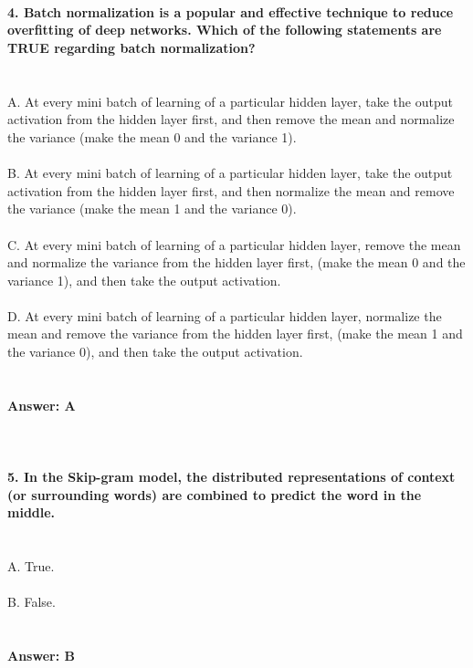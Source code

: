 \documentclass[prl,twocolumn,showpacs,preprintnumbers,superscriptaddress]{revtex4}
\theoremstyle{plain}
\theoremstyle{definition}
\begin{document}
\begin{widetext}
\\
\\
\\
\textbf{4. Batch normalization is a popular and effective technique to reduce overfitting of deep networks. Which of the following statements are TRUE regarding batch normalization?}
\\
\\
\\
A. At every mini batch of learning of a particular hidden layer, take the output activation from the hidden layer first, and then remove the mean and normalize the variance (make the mean 0 and the variance 1).
\\
\\
B. At every mini batch of learning of a particular hidden layer, take the output activation from the hidden layer first, and then normalize the mean  and remove the variance (make the mean 1 and the variance 0).
\\
\\
C. At every mini batch of learning of a particular hidden layer, remove the mean  and normalize the variance from the hidden layer first, (make the mean 0 and the variance 1), and then take the output activation.
\\
\\
D. At every mini batch of learning of a particular hidden layer, normalize the mean and remove the variance from the hidden layer first, (make the mean 1 and the variance 0), and then take the output activation.
\\
\\
\\
\textbf{Answer: A}
\\
\\
\\
\\
\textbf{5. In the Skip-gram model, the distributed representations of context (or surrounding words) are combined to predict the word in the middle.}
\\
\\
\\
A. True.
\\
\\
B. False.
\\
\\
\\
\textbf{Answer: B}
\\
\\
\\
\\
\\
\\
\end{widetext}
\end{document}
